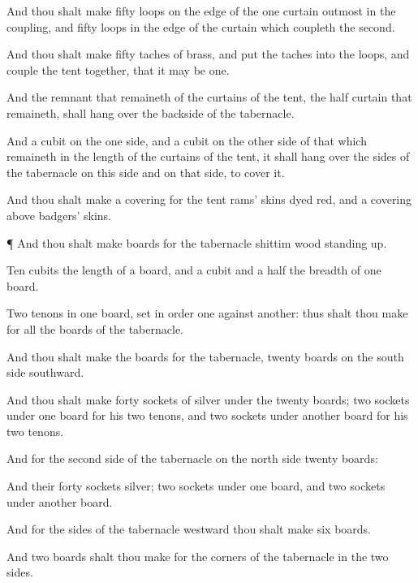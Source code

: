 {And thou shalt
make
fifty
loops on the
edge of the
one
curtain
{}
outmost in the
coupling, and
fifty
loops in the
edge of the
curtain which
coupleth the
second.

And thou shalt
make
fifty
taches of
brass, and
put the
taches into the
loops, and
couple the
tent together, that it may be
one.

And the
remnant that
remaineth of the
curtains of the
tent, the
half
curtain that
remaineth, shall
hang over the
backside of the
tabernacle.

And a
cubit on the one
side, and a
cubit on the other side of that which
remaineth in the
length of the
curtains of the
tent, it shall
hang over the
sides of the
tabernacle on this side and on that side, to
cover it.

And thou shalt
make a
covering for the
tent
{}
rams’
skins dyed
red, and a
covering
above
{}
badgers’
skins.


\par }{\PP {}¶ And thou shalt
make
boards for the
tabernacle
{}
shittim
wood standing
up.

Ten
cubits
{} the
length of a
board, and a
cubit and a
half
{} the
breadth of
one
board.

Two
tenons
{} in
one
board, set in
order
one against
another: thus shalt thou
make for all the
boards of the
tabernacle.

And thou shalt
make the
boards for the
tabernacle,
twenty
boards on the
south
side
southward.

And thou shalt
make
forty
sockets of
silver under the
twenty
boards;
two
sockets under
one
board for his
two
tenons, and
two
sockets under
another
board for his
two
tenons.

And for the
second
side of the
tabernacle on the
north
side
{}
twenty
boards:

And their
forty
sockets
{}
silver;
two
sockets under
one
board, and
two
sockets under
another
board.

And for the
sides of the
tabernacle
westward thou shalt
make
six
boards.

And
two
boards shalt thou
make for the
corners of the
tabernacle in the two
sides.

}
